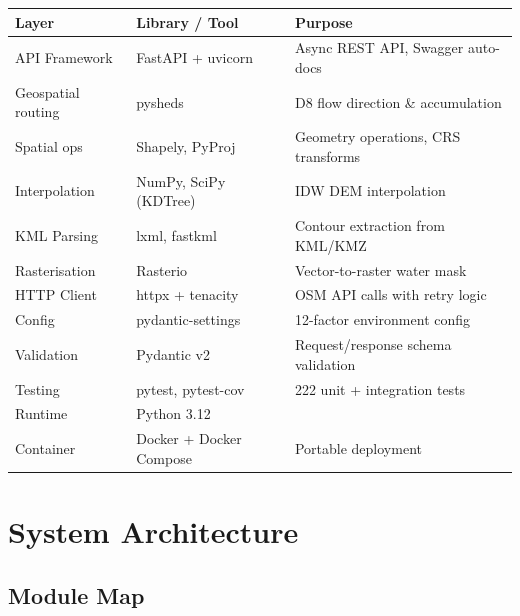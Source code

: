 \documentclass[12pt,a4paper]{article}
\begin{document}
\begin{center}
\begin{tabular}{lll}
    \toprule
    \textbf{Layer}     & \textbf{Library / Tool}       & \textbf{Purpose} \\
    \midrule
    API Framework      & FastAPI + uvicorn              & Async REST API, Swagger auto-docs \\
    Geospatial routing & pysheds                        & D8 flow direction \& accumulation \\
    Spatial ops        & Shapely, PyProj                & Geometry operations, CRS transforms \\
    Interpolation      & NumPy, SciPy (KDTree)          & IDW DEM interpolation \\
    KML Parsing        & lxml, fastkml                  & Contour extraction from KML/KMZ \\
    Rasterisation      & Rasterio                       & Vector-to-raster water mask \\
    HTTP Client        & httpx + tenacity               & OSM API calls with retry logic \\
    Config             & pydantic-settings              & 12-factor environment config \\
    Validation         & Pydantic v2                    & Request/response schema validation \\
    Testing            & pytest, pytest-cov             & 222 unit + integration tests \\
    Runtime            & Python 3.12                    & \\
    Container          & Docker + Docker Compose        & Portable deployment \\
    \bottomrule
\end{tabular}
\end{center}

\section{System Architecture}

\subsection{Module Map}
\end{document}
